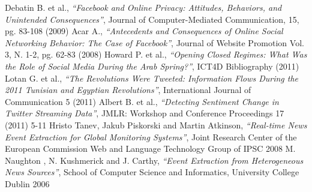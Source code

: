 \documentclass[a4paper]{article}
\begin{document}
\begin{thebibliography}{9}
Debatin B. et al., \emph{``Facebook and Online Privacy: Attitudes, Behaviors,
and Unintended Consequences''}, Journal of Computer-Mediated Communication,
15, pg. 83-108 (2009)
Acar A., \emph{``Antecedents and Consequences of Online Social Networking
Behavior: The Case of Facebook''}, Journal of Website Promotion Vol. 3, N.
1-2, pg. 62-83 (2008)
Howard P. et al., \emph{``Opening Closed Regimes: What Was the Role of Social Media
During the Arab Spring?''}, ICT4D Bibliography (2011)
Lotan G. et al., \emph{``The Revolutions Were Tweeted: Information Flows During
the 2011 Tunisian and Egyptian Revolutions''}, International Journal of
Communication 5 (2011)
Albert B. et al., \emph{``Detecting Sentiment Change in Twitter Streaming
	Data''}, JMLR: Workshop and Conference Proceedings 17 (2011) 5-11
Hristo Tanev, Jakub Piskorski and Martin Atkinson, \emph{``Real-time News Event Extraction for Global Monitoring Systems''}, Joint Research Center of the European Commission Web and Language Technology Group of IPSC 2008
M. Naughton , N. Kushmerick and J. Carthy, \emph{``Event Extraction from Heterogeneous News Sources''}, School of Computer Science and Informatics, University College Dublin 2006
\end{thebibliography}
\end{document}
